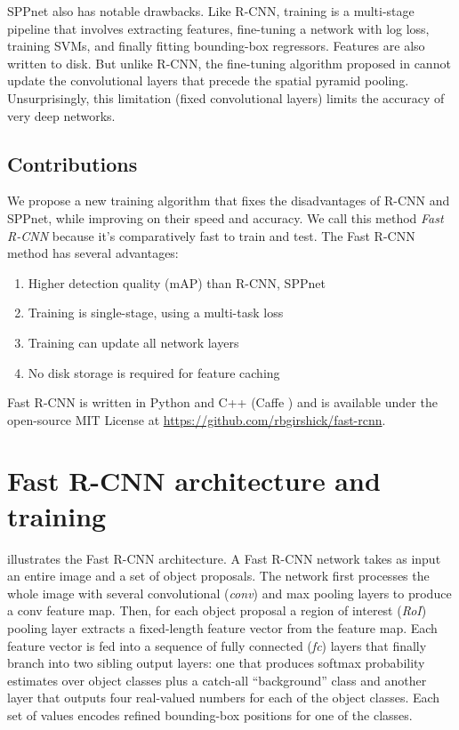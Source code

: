 \documentclass[10pt,twocolumn,letterpaper]{article}
\newcommand{\roi}{RoI\xspace}
\begin{document}
SPPnet also has notable drawbacks.
Like R-CNN, training is a multi-stage pipeline that involves extracting features, fine-tuning a network with log loss, training SVMs, and finally fitting bounding-box regressors.
Features are also written to disk.
But unlike R-CNN, the fine-tuning algorithm proposed in \cite{he2014spp} cannot update the convolutional layers that precede the spatial pyramid pooling.
Unsurprisingly, this limitation (fixed convolutional layers) limits the accuracy of very deep networks.

\subsection{Contributions}
We propose a new training algorithm that fixes the disadvantages of R-CNN and SPPnet, while improving on their speed and accuracy.
We call this method \emph{Fast R-CNN} because it's comparatively fast to train and test.
The Fast R-CNN method has several advantages:
\begin{enumerate}
  \itemsep0em
  \item Higher detection quality (mAP) than R-CNN, SPPnet
  \item Training is single-stage, using a multi-task loss
  \item Training can update all network layers
  \item No disk storage is required for feature caching
\end{enumerate}

Fast R-CNN is written in Python and C++ (Caffe \cite{jia2014caffe}) and is available under the open-source MIT License at \url{https://github.com/rbgirshick/fast-rcnn}.
 \section{Fast R-CNN architecture and training}

 illustrates the Fast R-CNN architecture.
A Fast R-CNN network takes as input an entire image and a set of object proposals.
The network first processes the whole image with several convolutional (\emph{conv}) and max pooling layers to produce a conv feature map.
Then, for each object proposal a region of interest (\emph{\roi}) pooling layer extracts a fixed-length feature vector from the feature map.
Each feature vector is fed into a sequence of fully connected (\emph{fc}) layers that finally branch into two sibling output layers: one that produces softmax probability estimates over  object classes plus a catch-all ``background'' class and another layer that outputs four real-valued numbers for each of the  object classes.
Each set of  values encodes refined bounding-box positions for one of the  classes.
\end{document}
